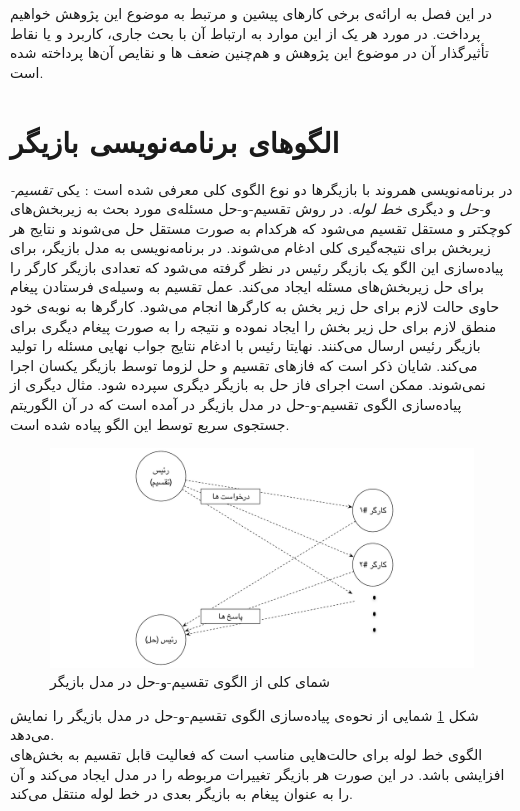 در این فصل به ارائه‌ی برخی کارهای پیشین و مرتبط به موضوع این پژوهش خواهیم پرداخت. در مورد هر یک از این موارد به ارتباط آن با بحث جاری، کاربرد و یا نقاط تأثیرگذار آن در موضوع این پژوهش و هم‌چنین ضعف ها و نقایص آن‌ها پرداخته شده است. 
\section{الگوهای برنامه‌نویسی بازیگر}
\label{section:actorPatterns}
در برنامه‌نویسی همروند با بازیگر‌ها دو نوع الگوی کلی معرفی شده است \cite{Agha1990}: یکی  \textit{\gls{تقسیم-و-حل}} و دیگری \textit{\gls{خط لوله}}. 
در روش تقسیم-و-حل مسئله‌ی مورد بحث به زیربخش‌های کوچکتر و مستقل تقسیم می‌شود که هرکدام به صورت مستقل حل می‌شوند و نتایج هر زیربخش برای نتیجه‌گیری کلی ادغام می‌شوند. در برنامه‌نویسی به مدل بازیگر، برای پیاده‌سازی این الگو یک بازیگر رئیس در نظر گرفته می‌شود که تعدادی بازیگر کارگر را برای حل زیربخش‌های مسئله ایجاد می‌کند. عمل تقسیم به وسیله‌ی فرستادن پیغام‌ حاوی حالت لازم برای حل زیر بخش به کارگر‌ها انجام می‌شود. کارگرها به نوبه‌ی خود منطق لازم برای حل زیر بخش را ایجاد نموده و نتیجه را به صورت پیغام دیگری برای بازیگر رئیس ارسال می‌کنند. نهایتا رئیس با ادغام نتایج جواب نهایی 
مسئله را تولید می‌کند. شایان ذکر است که فازهای تقسیم و حل لزوما توسط بازیگر یکسان اجرا نمی‌شوند. ممکن است اجرای فاز حل به بازیگر دیگری سپرده شود.\cite{Feng08scalablemodels}
مثال دیگری از پیاده‌سازی الگوی تقسیم-و-حل در مدل بازیگر  در \cite{Feng08scalablemodels} آمده است که در آن الگوریتم جستجوی سریع توسط این الگو پیاده شده است.
\begin{figure}
    \begin{center}
	\includegraphics[width=16cm]{3-RelatedWork/Figures/Divide_and_Conquer.pdf}
    \end{center}
    \caption{\label{fig:divide_conquer}  شمای کلی از الگوی تقسیم-و-حل در مدل بازیگر }
\end{figure}
شکل \ref{fig:divide_conquer} شمایی از نحوه‌ی پیاده‌سازی الگوی تقسیم-و-حل در مدل بازیگر را نمایش می‌دهد.\\
الگوی خط لوله برای حالت‌هایی مناسب است که فعالیت قابل تقسیم به بخش‌های افزایشی باشد. در این صورت هر بازیگر تغییرات مربوطه را در مدل ایجاد می‌کند و آن را به عنوان پیغام به بازیگر بعدی در خط لوله منتقل می‌کند.

